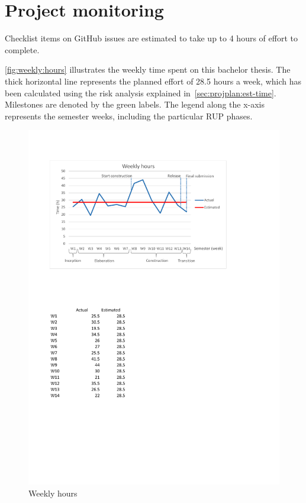 \chapter{Project monitoring}
Checklist items on GitHub issues are estimated to take up to 4 hours of effort to complete.

\autoref{fig:weekly:hours} illustrates the weekly time spent on this bachelor
thesis. The thick horizontal line represents the planned effort of 28.5 hours a
week, which has been calculated using the risk analysis explained
in~\autoref{sec:projplan:est-time}.  Milestones are denoted by the green
labels. The legend along the x-axis represents the semester weeks, including
the particular RUP phases.


\begin{figure}[]
	\includegraphics[trim=2cm 18.3cm 4.6cm 2.8cm, clip=true, width=\textwidth]{img/project_monitoring_weekly_hours_diagram.pdf}
	\caption{Weekly hours}
	\label{fig:weekly:hours}
\end{figure}

